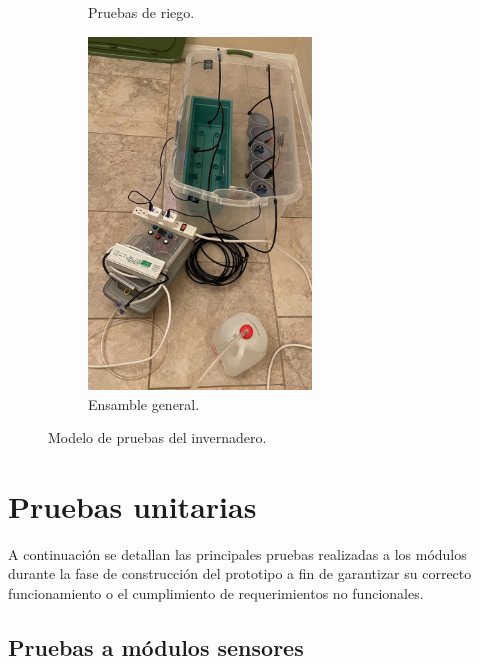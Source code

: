 \begin{figure}[htpb]
\begin{subfigure}[b]{0.45\textwidth}
		\caption{Pruebas de riego.}
		\label{fig:gh2}
     \end{subfigure}
     \hfill	
	 \begin{subfigure}[b]{0.45\textwidth}
		\centering
		\includegraphics[width=0.65\textwidth]{./Figures/chapter4/Invernadero3.jpg}
		\caption{Ensamble general.}
		\label{fig:gh3}
     \end{subfigure}
     \hfill

        \caption[Modelo de pruebas del invernadero]{Modelo de pruebas del invernadero.}
        \label{fig:invernadero}
\end{figure}



\pagebreak
\section{Pruebas unitarias}
\label{sec:Pruebas unitarias}

A continuación se detallan las principales pruebas realizadas a los módulos durante la fase de construcción del prototipo a fin de garantizar su correcto funcionamiento o el cumplimiento de requerimientos no funcionales.


\subsection{Pruebas a módulos sensores}
\label{sec:Pruebas a módulos sensores}

